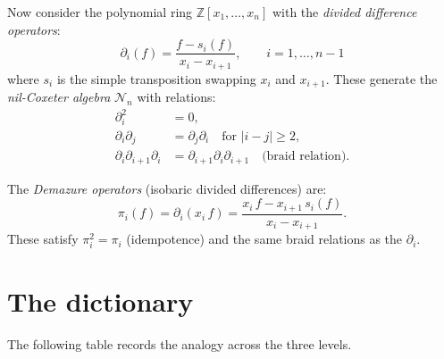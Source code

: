 \documentclass[11pt]{amsart}
\theoremstyle{definition}
\newcommand{\Z}{\mathbb{Z}}
\newcommand{\cN}{\mathcal{N}}
\begin{document}
Now consider the polynomial ring $\Z[x_1, \dots, x_n]$ with the
\emph{divided difference operators}:
\[
  \partial_i(f) = \frac{f - s_i(f)}{x_i - x_{i+1}},
  \qquad i = 1, \dots, n-1
\]
where $s_i$ is the simple transposition swapping $x_i$ and
$x_{i+1}$. These generate the \emph{nil-Coxeter algebra} $\cN_n$
with relations:
\begin{align}
  \partial_i^2 &= 0, \label{eq:nilpotent} \\
  \partial_i \partial_j &= \partial_j \partial_i
  \quad \text{for } |i - j| \geq 2, \\
  \partial_i \partial_{i+1} \partial_i &= \partial_{i+1} \partial_i
  \partial_{i+1} \quad \text{(braid relation)}.
\end{align}

The \emph{Demazure operators} (isobaric divided differences) are:
\[
  \pi_i(f) = \partial_i(x_i\, f)
  = \frac{x_i\, f - x_{i+1}\, s_i(f)}{x_i - x_{i+1}}.
\]
These satisfy $\pi_i^2 = \pi_i$ (idempotence) and the same braid
relations as the $\partial_i$.

\section{The dictionary}

The following table records the analogy across the three levels.
\end{document}
